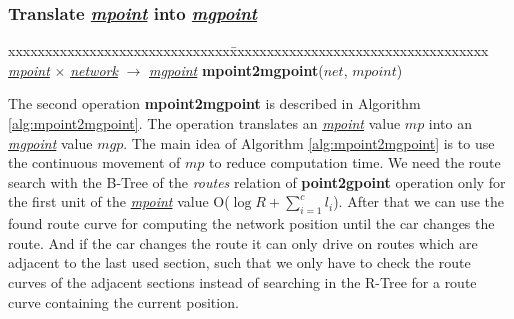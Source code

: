 \documentclass[a4paper]{article}
\newcommand{\op}[1]{\textbf{#1}}
\newcommand{\dt}[1]{\textsl{\underline{#1}}}
\begin{document}
\subsubsection{Translate \dt{mpoint} into \dt{mgpoint}}
\begin{tabbing}
xxxxxxxxxxxxxxxxxxxxxxxxxxxxxx\=xxxxxxxxxxxxxxxxxxxxxxxxxxxxxxxxxxx\kill
\dt{mpoint} $\times$ \dt{network} $\rightarrow$ \dt{mgpoint} \>
\op{mpoint2mgpoint}($net$, $mpoint$)\\
\end{tabbing}
The second operation \op{mpoint2mgpoint} is described in Algorithm
\ref{alg:mpoint2mgpoint}. The operation translates an \dt{mpoint} value $mp$
into an \dt{mgpoint} value $mgp$. The main idea of Algorithm
\ref{alg:mpoint2mgpoint} is to use the
continuous movement of $mp$ to reduce computation time. We need the route search
with the B-Tree of the \textit{routes} relation of \op{point2gpoint} operation only for
the first unit of the \dt{mpoint} value O($\log R + \sum_{i=1}^{c}{l_i}$).
After that we can use the found route curve
for computing the network position until the car changes the route. And if the
car changes the route it can only drive on routes which are adjacent to the last
used section, such that we only have to check the route curves of the adjacent
sections instead of searching in the R-Tree for a route curve containing the
current position.
\end{document}

